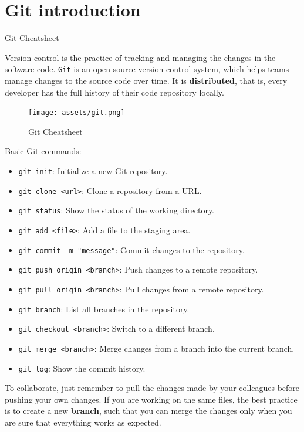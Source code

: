 \newpage
\section{Git introduction}

\href{https://ndpsoftware.com/git-cheatsheet.html#loc=workspace}{Git Cheatsheet}

Version control is the practice of tracking and managing the changes in the software code. \texttt{Git} is an open-source version control system, 
which helps teams manage changes to the source code over time. It is \textbf{distributed}, that is, every developer has the full history of their code repository locally.

\begin{figure}[H]
    \centering
    \texttt{[image: assets/git.png]}
    \caption{Git Cheatsheet}
    \label{fig:git_cs}
\end{figure}

Basic Git commands:
\begin{itemize}
    \item \texttt{git init}: Initialize a new Git repository.
    \item \texttt{git clone <url>}: Clone a repository from a URL.
    \item \texttt{git status}: Show the status of the working directory.
    \item \texttt{git add <file>}: Add a file to the staging area.
    \item \texttt{git commit -m "message"}: Commit changes to the repository.
    \item \texttt{git push origin <branch>}: Push changes to a remote repository.
    \item \texttt{git pull origin <branch>}: Pull changes from a remote repository.
    \item \texttt{git branch}: List all branches in the repository.
    \item \texttt{git checkout <branch>}: Switch to a different branch.
    \item \texttt{git merge <branch>}: Merge changes from a branch into the current branch.
    \item \texttt{git log}: Show the commit history.
\end{itemize}

To collaborate, just remember to pull the changes made by your colleagues before pushing your own changes. If you are working on the same files, the best practice is to create a new \textbf{branch},
such that you can merge the changes only when you are sure that everything works as expected.

